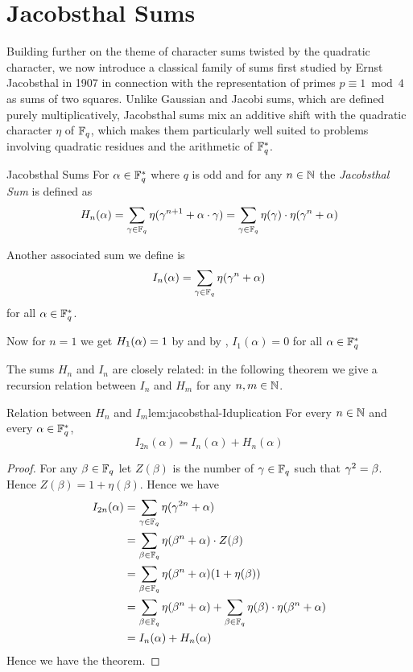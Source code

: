 \section{Jacobsthal Sums}\label{sec:jacobsthal}
Building further on the theme of character sums twisted by the quadratic character, we now introduce a classical family of sums first studied by Ernst Jacobsthal in 1907 in connection with the representation of primes $p\equiv 1\bmod 4$ as sums of two squares. Unlike Gaussian and Jacobi sums, which are defined purely multiplicatively, Jacobsthal sums mix an additive shift with the quadratic character $\eta$ of $\mathbb{F}_q$, which makes them particularly well suited to problems involving quadratic residues and the arithmetic of $\mathbb{F}_q^*$.
\begin{Definition}{Jacobsthal Sums}{}
  For $\alpha\in\mathbb{F}_q^*$ where $q$ is odd and for any $n\in\mathbb{N}$ the \emph{Jacobsthal Sum} is defined as $$H_n(\alpha)=\sum_{\gamma\in\mathbb{F}_q}\eta(\gamma^{n+1}+\alpha\cdot \gamma)=\sum_{\gamma\in\mathbb{F}_q}\eta(\gamma)\cdot \eta(\gamma^n+\alpha)$$

  Another associated sum we define is $$I_n(\alpha)=\sum_{\gamma\in\mathbb{F}_q}\eta(\gamma^n+\alpha)$$ for all $\alpha\in\mathbb{F}_q^*$.
\end{Definition}

Now for $n=1$ we get $H_1(\alpha)=\-1$ by  and by \AddCharPropsthm[(i)], $I_1(\alpha)=0$ for all $\alpha\in\mathbb{F}_q^*$ 

The sums $H_n$ and $I_n$ are closely related: in the following theorem we give a recursion relation between $I_n$ and $H_m$ for any $n,m\in\mathbb{N}$. 
\begin{lemma}{Relation between $H_n$ and $I_m$}{lem:jacobsthal-Iduplication}
  For every $n\in\mathbb{N}$ and every $\alpha\in\mathbb{F}_q^*$, $$I_{2n}(\alpha)=I_n(\alpha)+H_n(\alpha)$$
\end{lemma}
\begin{proof}
  For any $\beta\in\mathbb{F}_q$ let $Z(\beta)$ is the number of $\gamma\in\mathbb{F}_q$ such that $\gamma^2=\beta$. Hence $Z(\beta)=1+\eta(\beta)$. Hence we have \begin{align*}
    I_{2n}(\alpha)& = \sum_{\gamma\in\mathbb{F}_q}\eta(\gamma^{2n}+\alpha) \\ 
    & = \sum_{\beta\in\mathbb{F}_q}\eta(\beta^n+\alpha)\cdot Z(\beta)\\ 
    & = \sum_{\beta\in\mathbb{F}_q}\eta(\beta^n+\alpha)(1+\eta(\beta))\\ 
    & = \sum_{\beta\in\mathbb{F}_q}\eta(\beta^n+\alpha) + \sum_{\beta\in\mathbb{F}_q}\eta(\beta)\cdot \eta(\beta^n+\alpha)\\ 
    & = I_n(\alpha)+H_n(\alpha)
  \end{align*}Hence we have the theorem. 
\end{proof}

